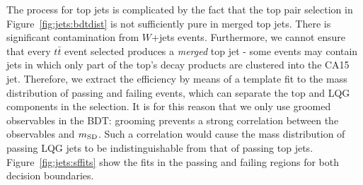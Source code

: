 The process for top jets is complicated by the fact that the top pair selection in Figure~\ref{fig:jets:bdtdist} is not sufficiently pure in merged top jets.
There is significant contamination from $W$+jets events.
Furthermore, we cannot ensure that every $t\bar{t}$ event selected produces a \emph{merged} top jet - some events may contain jets in which only part of the top's decay products are clustered into the CA15 jet.
Therefore, we extract the efficiency by means of a template fit to the mass distribution of passing and failing events, which can separate the top and LQG components in the selection.
It is for this reason that we only use groomed observables in the BDT: grooming prevents a strong correlation between the observables and $m_{\mathrm{SD}}$.
Such a correlation would cause the mass distribution of passing LQG jets to be indistinguishable from that of passing top jets.
Figure~\ref{fig:jets:sffits} show the fits in the passing and failing regions for both decision boundaries.

